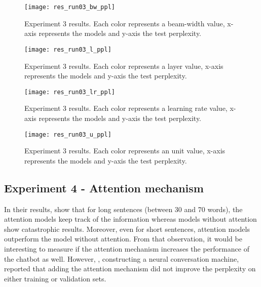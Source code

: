\begin{landscape}
\begin{figure}
    \centering
    \texttt{[image: res\_run03\_bw\_ppl]}
    \decoRule
    \caption[Results experiment 3 BW-PPL]{Experiment 3 results. Each color represents a beam-width value, x-axis represents the models and y-axis the test perplexity.}
    \label{fig:res_run03_bw_ppl}
\end{figure}
\begin{figure}
    \centering
    \texttt{[image: res\_run03\_l\_ppl]}
    \decoRule
    \caption[Results experiment 3 L-PPL]{Experiment 3 results. Each color represents a layer value, x-axis represents the models and y-axis the test perplexity.}
    \label{fig:res_run03_l_ppl}
\end{figure}
\begin{figure}
    \centering
    \texttt{[image: res\_run03\_lr\_ppl]}
    \decoRule
    \caption[Results experiment 3 LR-PPL]{Experiment 3 results. Each color represents a learning rate value, x-axis represents the models and y-axis the test perplexity.}
    \label{fig:res_run03_lr_ppl}
\end{figure}
\begin{figure}
    \centering
    \texttt{[image: res\_run03\_u\_ppl]}
    \decoRule
    \caption[Results experiment 3 U-PPL]{Experiment 3 results. Each color represents an unit value, x-axis represents the models and y-axis the test perplexity.}
    \label{fig:res_run03_u_ppl}
\end{figure}
\end{landscape}

\subsection{Experiment 4 - Attention mechanism}
In their results, \citet{1508.04025} show that for long sentences (between 30 and 70 words), the attention models keep track of the information whereas models without attention show catastrophic results. Moreover, even for short sentences, attention models outperform the model without attention. From that observation, it would be interesting to measure if the attention mechanism increases the performance of the chatbot as well. However, \citet{1506.05869}, constructing a neural conversation machine, reported that adding the attention mechanism \citep{1409.0473} did not improve the perplexity on either training or validation sets.

